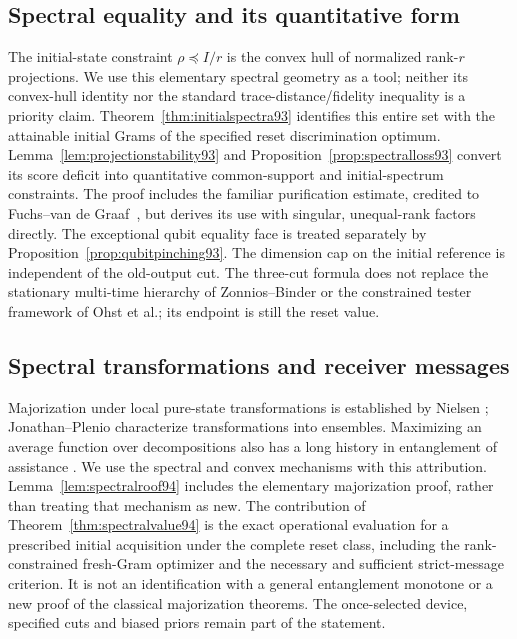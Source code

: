 \subsection{Spectral equality and its quantitative form}
The initial-state constraint $\rho\preceq I/r$ is the convex hull of
normalized rank-$r$ projections.  We use this elementary spectral
geometry as a tool; neither its convex-hull identity nor the standard
trace-distance/fidelity inequality is a priority claim.
Theorem~\ref{thm:initialspectra93} identifies this entire set with the
attainable initial Grams of the specified reset discrimination optimum.
Lemma~\ref{lem:projectionstability93} and
Proposition~\ref{prop:spectralloss93} convert its score deficit into
quantitative common-support and initial-spectrum constraints.
The proof includes the familiar purification estimate, credited to
Fuchs--van de Graaf~\cite{FvdG93}, but derives its use with singular,
unequal-rank factors directly.  The exceptional qubit equality face
is treated separately by Proposition~\ref{prop:qubitpinching93}.
The dimension cap on the initial reference is independent of the
old-output cut.  The three-cut formula does not replace the stationary
multi-time hierarchy of Zonnios--Binder or the constrained tester
framework of Ohst et al.; its endpoint is still the reset value.

\subsection{Spectral transformations and receiver messages}
Majorization under local pure-state transformations is established by
Nielsen \cite{Nielsen94}; Jonathan--Plenio \cite{JonathanPlenio94}
characterize transformations into ensembles.  Maximizing an average
function over decompositions also has a long history in entanglement
of assistance \cite{Assistance94}.  We use the spectral and convex
mechanisms with this attribution.  Lemma~\ref{lem:spectralroof94}
includes the elementary majorization proof, rather than treating that
mechanism as new.  The contribution of
Theorem~\ref{thm:spectralvalue94} is the exact operational evaluation
for a prescribed initial acquisition under the complete reset class,
including the rank-constrained fresh-Gram optimizer and the necessary
and sufficient strict-message criterion.  It is not an identification
with a general entanglement monotone or a new proof of the classical
majorization theorems.  The once-selected device, specified cuts and
biased priors remain part of the statement.

